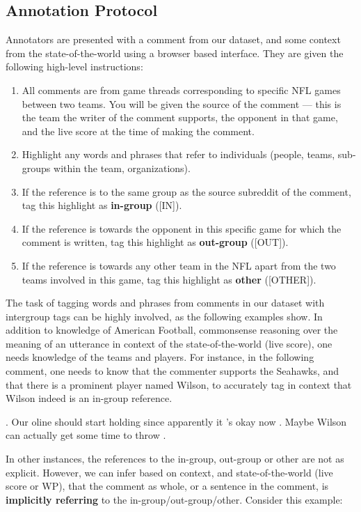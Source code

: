 \subsection{Annotation Protocol}

Annotators are presented with a comment from our dataset, and some context from the state-of-the-world using a browser based interface. They are given the following high-level instructions:

\begin{enumerate}
    \item All comments are from game threads corresponding to specific NFL games between two teams. You will be given the source of the comment --- this is the team the writer of the comment supports, the opponent in that game, and the live score at the time of making the comment.
    \item Highlight any words and phrases that refer to individuals (people, teams, sub-groups within the team, organizations).
    \item If the reference is to the same group as the source subreddit of the comment, tag this highlight as \textbf{in-group} ([IN]).
    \item If the reference is towards the opponent in this specific game for which the comment is written, tag this highlight as \textbf{out-group} ([OUT]).
    \item If the reference is towards any other team in the NFL apart from the two teams involved in this game, tag this highlight as \textbf{other} ([OTHER]).
\end{enumerate}

The task of tagging words and phrases from comments in our dataset with intergroup tags can be highly involved, as the following examples show. In addition to knowledge of American Football, commonsense reasoning over the meaning of an utterance in context of the state-of-the-world (live score), one needs knowledge of the teams and players. For instance, in the following comment, one needs to know that the commenter supports the Seahawks, and that there is a prominent player named Wilson, to accurately tag in context that Wilson indeed is an in-group reference.

\ex. Our oline should start holding since apparently it ’s okay now . Maybe Wilson can actually get some time to throw .

In other instances, the references to the in-group, out-group or other are not as explicit. However, we can infer based on context, and state-of-the-world (live score or WP), that the comment as whole, or a sentence in the comment, is \textbf{implicitly referring} to the in-group/out-group/other. Consider this example:

